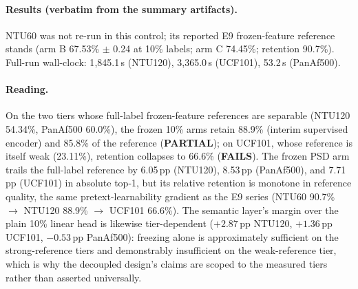 \documentclass[11pt,a4paper]{article}
\begin{document}
\paragraph{Results (verbatim from the summary artifacts).}
\begin{center}
\footnotesize
{}%
\end{center}
NTU60 was not re-run in this control; its reported E9 frozen-feature reference stands (arm B 67.53\% $\pm$ 0.24 at 10\% labels; arm C 74.45\%; retention 90.7\%). Full-run wall-clock: 1{,}845.1\,s (NTU120), 3{,}365.0\,s (UCF101), 53.2\,s (PanAf500).

\paragraph{Reading.}
On the two tiers whose full-label frozen-feature references are separable (NTU120 54.34\%, PanAf500 60.0\%), the frozen 10\% arms retain 88.9\% (interim supervised encoder) and 85.8\% of the reference (\textbf{PARTIAL}); on UCF101, whose reference is itself weak (23.11\%), retention collapses to 66.6\% (\textbf{FAILS}). The frozen PSD arm trails the full-label reference by 6.05\,pp (NTU120), 8.53\,pp (PanAf500), and 7.71\,pp (UCF101) in absolute top-1, but its relative retention is monotone in reference quality, the same pretext-learnability gradient as the E9 series (NTU60 90.7\% $\to$ NTU120 88.9\% $\to$ UCF101 66.6\%). The semantic layer's margin over the plain 10\% linear head is likewise tier-dependent ($+2.87$\,pp NTU120, $+1.36$\,pp UCF101, $-0.53$\,pp PanAf500): freezing alone is approximately sufficient on the strong-reference tiers and demonstrably insufficient on the weak-reference tier, which is why the decoupled design's claims are scoped to the measured tiers rather than asserted universally.
\end{document}
